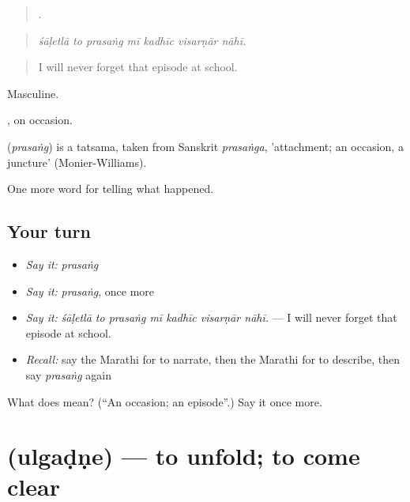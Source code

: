 \begin{quote}
      .
\end{quote}

\begin{quote}
\emph{śāḷetlā to prasaṅg mī kadhīc visarṇār nāhī.}
\end{quote}

\begin{quote}
I will never forget that episode at school.
\end{quote}

Masculine.

, on occasion.

\begin{cousinweb}
\textbf{} (\emph{prasaṅg}) is a tatsama, taken from Sanskrit \emph{prasaṅga}, 'attachment; an occasion, a juncture' (Monier-Williams).
\end{cousinweb}

\begin{grammarlens}[title={What you've built}]
One more word for telling what happened.
\end{grammarlens}

\subsection*{Your turn}
\begin{itemize}
\raggedright
  \item \emph{Say it:} \emph{prasaṅg}
  \item \emph{Say it:} \emph{prasaṅg}, once more
  \item \emph{Say it:} \emph{śāḷetlā to prasaṅg mī kadhīc visarṇār nāhī.} — I will never forget that episode at school.
  \item \emph{Recall:} say the Marathi for to narrate, then the Marathi for to describe, then say \emph{prasaṅg} again
\end{itemize}

\begin{tcolorbox}[breakable,colback=teal!4,colframe=teal!35!black,title={Before you move on}]
What does  mean? (\textquotedblleft{}An occasion; an episode\textquotedblright{}.) Say it once more.
\end{tcolorbox}
\section[\texorpdfstring{\mr{उलगडणे} (ulgaḍṇe)}{उलगडणे (ulgaḍṇe)}]{ (ulgaḍṇe) — to unfold; to come clear}

